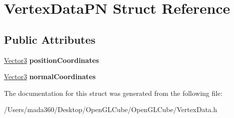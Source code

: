 \hypertarget{struct_vertex_data_p_n}{}\section{Vertex\+Data\+P\+N Struct Reference}
\label{struct_vertex_data_p_n}
\subsection*{Public Attributes}
\begin{DoxyCompactItemize}
\item 
\hypertarget{struct_vertex_data_p_n_a0e4ff0d14f27ca168f50fcf3f2b6c176}{}\hyperlink{struct_vector3}{Vector3} {\bfseries position\+Coordinates}\label{struct_vertex_data_p_n_a0e4ff0d14f27ca168f50fcf3f2b6c176}

\item 
\hypertarget{struct_vertex_data_p_n_a02c260af609e238f1dccd509eb8d0d37}{}\hyperlink{struct_vector3}{Vector3} {\bfseries normal\+Coordinates}\label{struct_vertex_data_p_n_a02c260af609e238f1dccd509eb8d0d37}

\end{DoxyCompactItemize}


The documentation for this struct was generated from the following file\+:\begin{DoxyCompactItemize}
\item 
/\+Users/mada360/\+Desktop/\+Open\+G\+L\+Cube/\+Open\+G\+L\+Cube/Vertex\+Data.\+h\end{DoxyCompactItemize}
